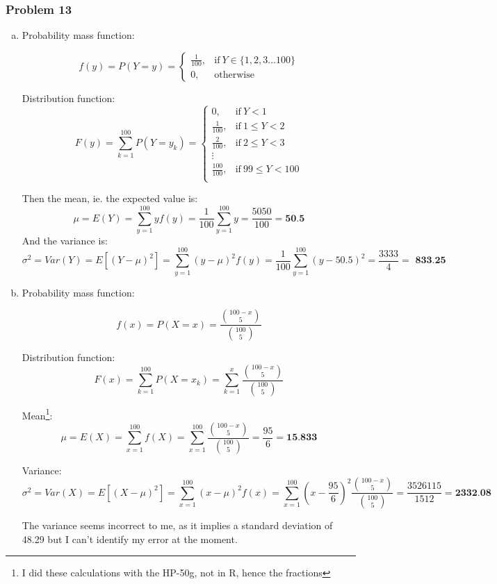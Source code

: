 \documentclass[11pt]{extarticle}
\begin{document}
 \subsubsection*{Problem 13}

\begin{enumerate}[(a)]
\item Probability mass function:

$$
f(y) = P(Y = y) = 
	\begin{cases}
		\frac{1}{100}, & \text{if}\  Y \in \{1, 2, 3 \dots 100\} \\
		0, & \text{otherwise}
	\end{cases}
$$

Distribution function: $$
F(y) = \sum_{k=1}^{100} P(Y = y_k) = \begin{cases}
		0, & \text{if}\ Y < 1 \\
		\frac{1}{100}, & \text{if}\ 1 \leq  Y < 2 \\
		\frac{2}{100}, & \text{if}\ 2 \leq  Y < 3 \\
				\vdots & \  \\
		\frac{100}{100}, & \text{if}\ 99 \leq  Y < 100 \\
	\end{cases}
$$

Then the mean, ie. the expected value is: $$
\mu = E(Y) = \sum_{y=1}^{100} y f(y) =  \frac{1}{100} \sum_{y=1}^{100} y = \frac{5050}{100} = \textbf{50.5}$$
And the variance is: $$
\sigma^2 =  Var(Y) = E[(Y - \mu)^2] = \sum_{y=1}^{100} (y - \mu)^2 f(y) = \frac{1}{100}  \sum_{y=1}^{100} (y - 50.5)^2 = \frac{3333}{4} =\textbf{ 833.25}
$$

\item Probability mass function:

$$
f(x) = P(X = x) = \frac{{100-x \choose 5}}{{100 \choose 5}} 
$$

Distribution function: $$
F(x) = \sum_{k=1}^{100} P(X = x_k) = \sum_{k=1}^{x} \frac{{100-x \choose 5}}{{100 \choose 5}} 
$$ 

Mean\footnote{I did these calculations with the HP-50g, not in R, hence the fractions}: $$
\mu = E(X) = \sum_{x=1}^{100}  f(X) =  \sum_{x=1}^{100}  \frac{{100-x \choose 5}}{{100 \choose 5}} = \frac{95}{6} = \textbf{15.833}
$$ 

Variance: $$
\sigma^2 = Var(X) = E[(X - \mu)^2] = \sum_{x=1}^{100} (x - \mu)^2 f(x) = \sum_{x=1}^{100} \left( x-\frac{95}{6} \right)^2  \frac{{100-x \choose 5}}{{100 \choose 5}} = \frac{3526115}{1512} = \textbf{2332.08}
$$ 

The variance seems incorrect to me, as it implies a standard deviation of 48.29 but I can't identify my error at the moment.

\end{enumerate} 
\end{document}
